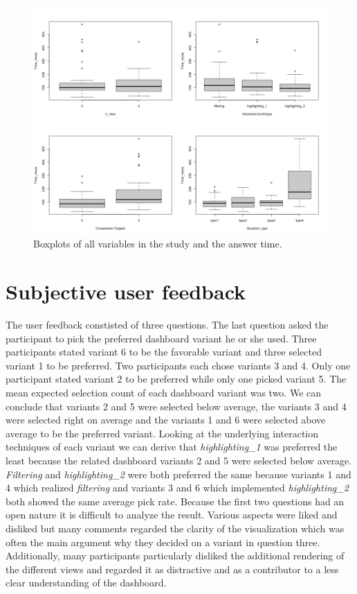 \begin{figure}[ht]
    \centering
    \includegraphics[width=15.5cm]{images/boxplots.png}
    \caption{Boxplots of all variables in the study and the answer time.} \label{boxplotsStudyVariablesAnswerTimefigure}
\end{figure}

\section{Subjective user feedback}
The user feedback constisted of three questions. The last question asked the participant to pick the preferred dashboard variant he or she used.
Three participants stated variant 6 to be the favorable variant and three selected variant 1 to be preferred. Two participants each chose variants 3 and 4. Only one participant
stated variant 2 to be preferred while only one picked variant 5. The mean expected selection count of each dashboard variant was two. We can conclude that
variants 2 and 5 were selected below average, the variants 3 and 4 were selected right on average and the variants 1 and 6 were selected above average to be
the preferred variant. Looking at the underlying interaction techniques of each variant we can derive that \textit{highlighting\_1} was preferred the least
because the related dashboard variants 2 and 5 were selected below average. \textit{Filtering} and \textit{highlighting\_2} were both preferred the same
because variants 1 and 4 which realized \textit{filtering} and variants 3 and 6 which implemented \textit{highlighting\_2} both showed the same average pick rate.
Because the first two questions had an open nature it is difficult to analyze the result. Various aspects were liked and disliked but many comments
regarded the clarity of the visualization which was often the main argument why they decided on a variant in question three. Additionally, many participants
particularly disliked the additional rendering of the different views and regarded it as distractive and as a contributor to a less clear understanding of
the dashboard.